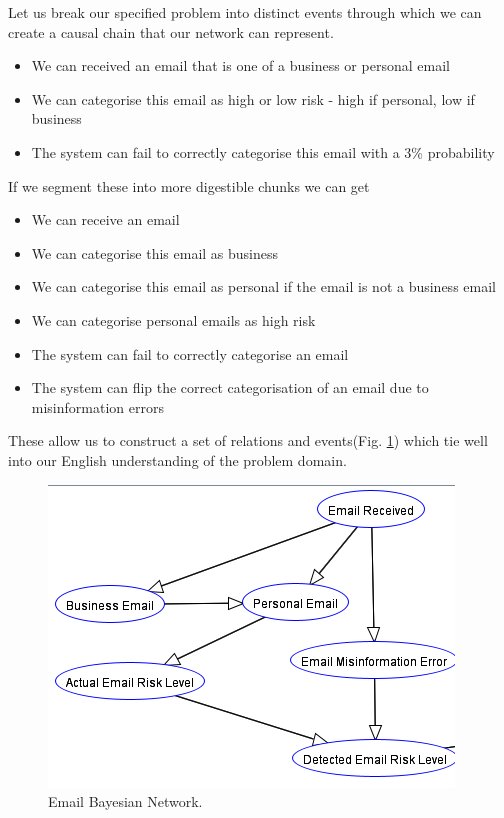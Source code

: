 \documentclass[10pt,a4paper]{article}
\begin{document}
Let us break our specified problem into distinct events through which we can create a causal chain that our network can represent.

\begin{itemize}
\item We can received an email that is one of a business or personal email
\item We can categorise this email as high or low risk - high if personal, low if business
\item The system can fail to correctly categorise this email with a 3\% probability
\end{itemize}

If we segment these into more digestible chunks we can get

\begin{itemize}
\item We can receive an email
\item We can categorise this email as business
\item We can categorise this email as personal if the email is not a business email
\item We can categorise personal emails as high risk
\item The system can fail to correctly categorise an email
\item The system can flip the correct categorisation of an email due to misinformation errors
\end{itemize}

These allow us to construct a set of relations and events(Fig. \ref{fig:email_network}) which tie well into our English understanding of the problem domain.

\begin{figure}
\centering
  \includegraphics{email_network.png}
  \caption{Email Bayesian Network.}
  \label{fig:email_network}
\end{figure}
\end{document}
